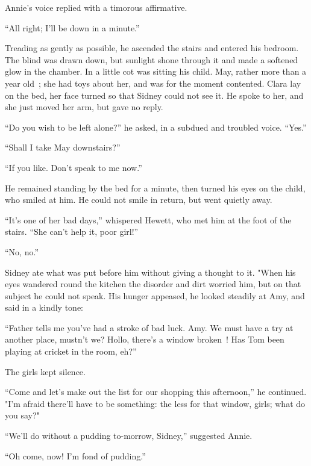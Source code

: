 Annie's voice replied with a timorous affirmative.

``All right; I'll be down in a minute.''

Treading as gently as possible, he ascended the stairs and entered his
bedroom. The blind was drawn down, but sunlight shone through it and
made a softened glow in the chamber. In a little cot was sitting his
child. May, rather more than a year old~; she had toys about her, and
was for the moment contented. Clara lay on the bed, her face turned so
that Sidney could not see it. He spoke to her, and she just moved her
arm, but gave no reply.

``Do you wish to be left alone?'' he asked, in a subdued and troubled
voice. {}``Yes.''

``Shall I take May downstairs?''

``If you like. Don't speak to me now.''

He remained standing by the bed for a minute, then turned his eyes on
the child, who smiled at him. He could not smile in return, but went
quietly away.

``It's one of her bad days,'' whispered Hewett, who met him at the foot
of the stairs. ``She can't help it, poor girl!''

``No, no.''

Sidney ate what was put before him without giving a thought to it. "When
his eyes wandered round the kitchen the disorder and dirt worried him,
but on that subject he could not speak. His hunger appeased, he looked
steadily at Amy, and said in a kindly tone:

``Father tells me you've had a stroke of bad luck. Amy. We must have a
try at another place, mustn't we? Hollo, there's a window broken~! Has
Tom been playing at cricket in the room, eh?''

The girls kept silence.

``Come and let's make out the list for our shopping this afternoon,'' he
continued. "I'm {} afraid there'll have to be something: the less for
that window, girls; what do you say?"

``We'll do without a pudding to-morrow, Sidney,'' suggested Annie.

``Oh come, now! I'm fond of pudding.''

